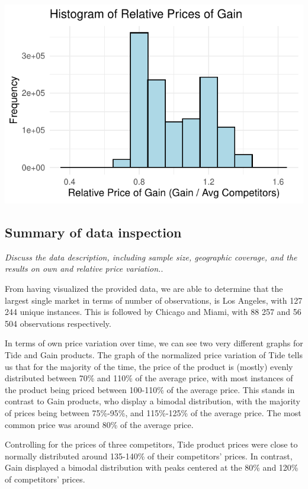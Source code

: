 \documentclass[
]{article}
\begin{document}
\begin{flushright}\includegraphics{Base-Pricing_files/figure-latex/unnamed-chunk-18-2} \end{flushright}

\subsection{Summary of data
inspection}\label{summary-of-data-inspection}

\emph{Discuss the data description, including sample size, geographic
coverage, and the results on own and relative price variation.}.

From having visualized the provided data, we are able to determine that
the largest single market in terms of number of observations, is Los
Angeles, with 127 244 unique instances. This is followed by Chicago and
Miami, with 88 257 and 56 504 observations respectively.

In terms of own price variation over time, we can see two very different
graphs for Tide and Gain products. The graph of the normalized price
variation of Tide tells us that for the majority of the time, the price
of the product is (mostly) evenly distributed between 70\% and 110\% of
the average price, with most instances of the product being priced
between 100-110\% of the average price. This stands in contrast to Gain
products, who display a bimodal distribution, with the majority of
prices being between 75\%-95\%, and 115\%-125\% of the average price.
The most common price was around 80\% of the average price.

Controlling for the prices of three competitors, Tide product prices
were close to normally distributed around 135-140\% of their
competitors' prices. In contrast, Gain displayed a bimodal distribution
with peaks centered at the 80\% and 120\% of competitors' prices.
\end{document}
